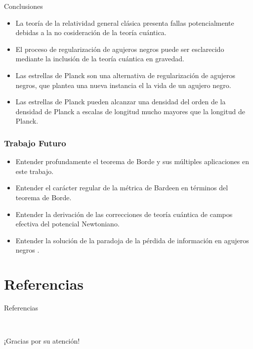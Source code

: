 \documentclass[t]{beamer}
\numberwithin{equation}{section}
\begin{document}
\begin{frame}{Conclusiones}
\begin{itemize}
\item La teoría de la relatividad general clásica presenta fallas potencialmente debidas a la no cosideración de la teoría cuántica.
\vspace*{\fill}
\item El proceso de regularización de agujeros negros puede ser esclarecido mediante la inclusión de la teoría cuántica en gravedad.
\vspace{\fill}
\item Las estrellas de Planck son una alternativa de regularización de agujeros negros, que plantea una nueva instancia el la vida de un agujero negro.
\vspace*{\fill}
\item Las estrellas de Planck pueden alcanzar una densidad del orden de la densidad de Planck a escalas de longitud mucho mayores que la longitud de Planck.
\end{itemize}
\end{frame}


\begin{frame}
\frametitle{Trabajo Futuro}
\vspace*{\fill}
\begin{itemize}
\item Entender profundamente el teorema de Borde y sus múltiples aplicaciones en este trabajo.

\vspace*{\fill}
\item Entender el carácter regular de la métrica de Bardeen en términos del teorema de Borde.

\vspace*{\fill}
\item Entender la derivación de las correcciones de teoría cuántica de campos efectiva del potencial Newtoniano.

\vspace*{\fill}
\item Entender la solución de la paradoja de la pérdida de información en agujeros negros \cite{rovelliquantum}.
\end{itemize}
\vspace{\fill}
\end{frame}

\section{Referencias}
\begin{frame}[t, allowframebreaks]{Referencias}
\footnotesize


\end{frame}
 

\begin{frame}
\Huge{
\
\\
\vspace*{\fill}
\centerline{
¡Gracias por su atención!}
}
\vspace*{\fill}
\end{frame}
\end{document}
